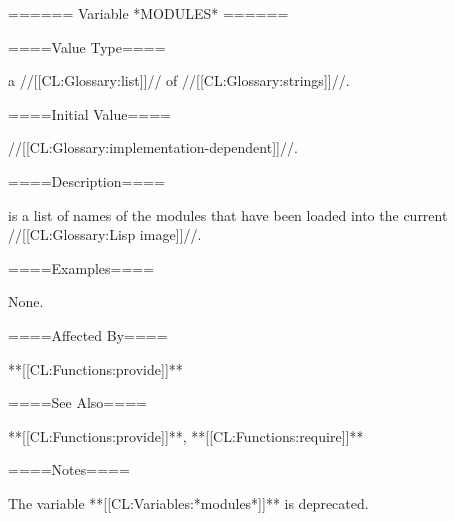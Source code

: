 ====== Variable *MODULES* ======

====Value Type====

a //[[CL:Glossary:list]]// of //[[CL:Glossary:strings]]//.

====Initial Value====

//[[CL:Glossary:implementation-dependent]]//.

====Description====

 is a list of names of the modules that have been loaded into the current //[[CL:Glossary:Lisp image]]//.

====Examples====

None.

====Affected By====

**[[CL:Functions:provide]]**

====See Also====

**[[CL:Functions:provide]]**, **[[CL:Functions:require]]**

====Notes====

The variable **[[CL:Variables:*modules*]]** is deprecated.

